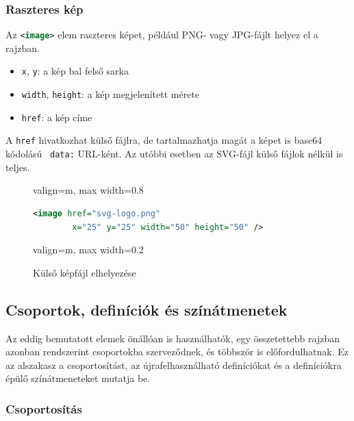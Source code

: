 \subsubsection{Raszteres kép}

Az \lstinline[language=XML]|<image>| elem raszteres képet, például PNG- vagy JPG-fájlt helyez el a rajzban.

\begin{itemize}
    \item \texttt{x}, \texttt{y}: a kép bal felső sarka
    \item \texttt{width}, \texttt{height}: a kép megjelenített mérete
    \item \texttt{href}: a kép címe
\end{itemize}

A \texttt{href} hivatkozhat külső fájlra, de tartalmazhatja magát a képet is base64 kódolású~\cite{mdn-base64} \texttt{data:} URL-ként. Az utóbbi esetben az SVG-fájl külső fájlok nélkül is teljes.

\begin{figure}[H]
    \centering
    \begin{adjustbox}{valign=m, max width=0.8\textwidth}
        \begin{lstlisting}[language=XML]
    <image href="svg-logo.png"
        x="25" y="25" width="50" height="50" />
        \end{lstlisting}
    \end{adjustbox}
    \hfill
    \begin{adjustbox}{valign=m, max width=0.2\textwidth}
        
    \end{adjustbox}
    \caption{Külső képfájl elhelyezése}
    \label{fig:example_img}
\end{figure}


\subsection{Csoportok, definíciók és színátmenetek}
\label{sub:group_defs}

Az eddig bemutatott elemek önállóan is használhatók, egy összetettebb rajzban azonban rendszerint csoportokba szerveződnek, és többször is előfordulhatnak. Ez az alszakasz a csoportosítást, az újrafelhasználható definíciókat és a definíciókra épülő színátmeneteket mutatja be.

\subsubsection{Csoportosítás}

